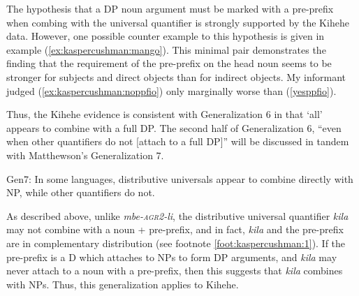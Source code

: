 \documentclass[output=paper,modfonts,nonflat]{langsci/langscibook}
\begin{document}
The hypothesis that a DP noun argument must be marked with a pre-prefix when combing with the universal quantifier is strongly supported by the Kihehe data.  However, one possible counter example to this hypothesis is given in example (\ref{ex:kaspercushman:mango}). This minimal pair demonstrates the finding that the requirement of the pre-prefix on the head noun seems to be stronger for subjects and direct objects than for indirect objects.  My informant judged (\ref{ex:kaspercushman:noppfio}) only marginally worse than (\ref{yesppfio}). 

\begin{exe} 
\ex  \label{ex:kaspercushman:mango} \begin{xlist}

\end{xlist}
\end{exe}

Thus, the Kihehe evidence is consistent with Generalization 6 in that `all' appears to combine with a full DP.  The second half of Generalization 6, ``even when other quantifiers do not [attach to a full DP]'' will be discussed in tandem with Matthewson's Generalization 7. 


\begin{exe}
\ex Gen7: In some languages, distributive universals appear to combine directly with NP, while other quantifiers do not. \cite[36]{matthewson13} 
\end{exe}

As described above, unlike \textit{mbe-\textsc{agr2}-li}, the distributive universal quantifier \textit{kila} may not combine with a noun + pre-prefix, and in fact, \textit{kila} and the pre-prefix are in complementary distribution (see footnote \ref{foot:kaspercushman:1}). If the pre-prefix is a D which attaches to NPs to form DP arguments, and \textit{kila} may never attach to a noun with a pre-prefix, then this suggests that \textit{kila} combines with NPs. Thus, this generalization applies to Kihehe. 
\end{document}
